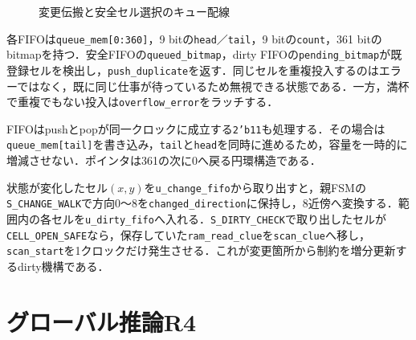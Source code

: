 \begin{figure}[tb]
  \centering
  \caption{変更伝搬と安全セル選択のキュー配線}
  \label{fig:solver-queue-wiring}
\end{figure}

各FIFOは\texttt{queue\_mem[0:360]}，9 bitの\texttt{head}／\texttt{tail}，9 bitの\texttt{count}，361 bitのbitmapを持つ．安全FIFOの\texttt{queued\_bitmap}，dirty FIFOの\texttt{pending\_bitmap}が既登録セルを検出し，\texttt{push\_duplicate}を返す．同じセルを重複投入するのはエラーではなく，既に同じ仕事が待っているため無視できる状態である．一方，満杯で重複でもない投入は\texttt{overflow\_error}をラッチする．

FIFOはpushとpopが同一クロックに成立する\texttt{2'b11}も処理する．その場合は\texttt{queue\_mem[tail]}を書き込み，\texttt{tail}と\texttt{head}を同時に進めるため，容量を一時的に増減させない．ポインタは361の次に0へ戻る円環構造である．

状態が変化したセル$(x,y)$を\texttt{u\_change\_fifo}から取り出すと，親FSMの\texttt{S\_CHANGE\_WALK}で方向0〜8を\texttt{changed\_direction}に保持し，8近傍へ変換する．範囲内の各セルを\texttt{u\_dirty\_fifo}へ入れる．\texttt{S\_DIRTY\_CHECK}で取り出したセルが\texttt{CELL\_OPEN\_SAFE}なら，保存していた\texttt{ram\_read\_clue}を\texttt{scan\_clue}へ移し，\texttt{scan\_start}を1クロックだけ発生させる．これが変更箇所から制約を増分更新するdirty機構である．

\section{グローバル推論R4}
\label{sec:solver-r4}

